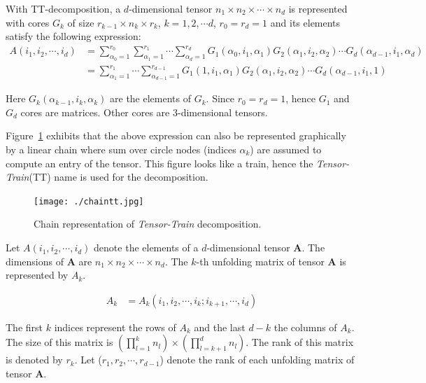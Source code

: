 \documentclass[runningheads]{llncs}
\newcommand{\tensor}[1]{\cal\textbf{#1}\xspace}
\newcommand{\ttrain}{{\it Tensor-Train}\xspace}
\begin{document}
\noindent With TT-decomposition, a $d$-dimensional tensor $n_1 \times n_2 \times \cdots \times n_d$ is represented with cores $G_k$ of size $r_{k-1}\times n_k\times r_k$, $k=1,2,\cdots d$, $r_0=r_d=1$ and its elements satisfy the following expression:
\begin{align*}
A(i_1, i_2,\cdots ,i_d) &= \sum_{\alpha_0 = 1}^{r_0} \sum_{\alpha_1 = 1}^{r_1} \cdots \sum_{\alpha_d = 1}^{r_d} G_1(\alpha_0, i_1, \alpha_1) G_2(\alpha_1, i_2, \alpha_2)\cdots G_d(\alpha_{d-1}, i_1, \alpha_d)\\
&= \sum_{\alpha_1 = 1}^{r_1} \cdots \sum_{\alpha_{d-1} = 1}^{r_{d-1}} G_1(1, i_1, \alpha_1) G_2(\alpha_1, i_2, \alpha_2)\cdots G_d(\alpha_{d-1}, i_1, 1)
\end{align*}

\noindent Here $G_k(\alpha_{k-1}, i_k, \alpha_k)$ are the elements of $G_k$. Since $r_0=r_d=1$, hence $G_1$ and $G_d$ cores are matrices. Other cores are $3$-dimensional tensors.

\noindent Figure~\ref{fig:ttrainchain} exhibits that the above expression can also be represented graphically by a linear chain where sum over circle nodes (indices $\alpha_k$) are assumed to compute an entry of the tensor. This figure looks like a train, hence the \ttrain (TT) name is used for the decomposition. 

\begin{figure}[htb]
	\begin{center}
		\texttt{[image: ./chaintt.jpg]}
		\caption{Chain representation of \ttrain decomposition.\label{fig:ttrainchain}}
	\end{center}
\end{figure}


Let $A(i_1,i_2,\cdots, i_d)$ denote the elements of a $d$-dimensional tensor \tensor{A}. The dimensions of \tensor{A} are $n_1 \times n_2 \times \cdots \times n_d$. The $k$-th unfolding matrix of tensor \tensor{A} is represented by $A_k$.

\begin{align*}
A_k &= A_k(i_1, i_2,\cdots, i_k; i_{k+1},\cdots ,i_d)
\end{align*}

\noindent The first $k$ indices represent the rows of $A_k$ and the last $d-k$ the columns of $A_k$. The size of this matrix is $(\prod_{l=1}^{k}n_l)\times(\prod_{l=k+1}^{d}n_l)$. The rank of this matrix is denoted by $r_k$. Let ($r_1, r_2,\cdots, r_{d-1}$) denote the rank of each unfolding matrix of tensor \tensor{A}.
\end{document}
